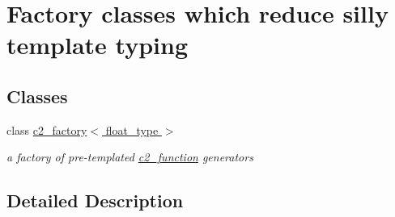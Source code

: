 \hypertarget{group__factories}{\section{Factory classes which reduce silly template typing}
\label{group__factories}
}
\subsection*{Classes}
\begin{DoxyCompactItemize}
\item 
class \hyperlink{classc2__factory}{c2\-\_\-factory$<$ float\-\_\-type $>$}
\begin{DoxyCompactList}\small\item\em a factory of pre-\/templated \hyperlink{classc2__function}{c2\-\_\-function} generators \end{DoxyCompactList}\end{DoxyCompactItemize}


\subsection{Detailed Description}
